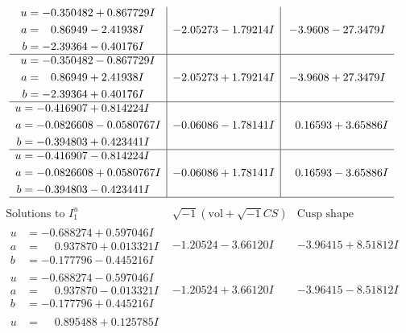 \documentclass[1p]{elsarticle_modified}
\theoremstyle{definition}
\newcommand{\I}{\sqrt{-1}}
\begin{document}
$$\begin{array}{c|c|c}
\begin{aligned}
u &= -0.350482 + 0.867729 I \\
a &= \phantom{-}0.86949 - 2.41938 I \\
b &= -2.39364 - 0.40176 I\end{aligned}
 & -2.05273 - 1.79214 I & -3.9608 - 27.3479 I \\ \hline\begin{aligned}
u &= -0.350482 - 0.867729 I \\
a &= \phantom{-}0.86949 + 2.41938 I \\
b &= -2.39364 + 0.40176 I\end{aligned}
 & -2.05273 + 1.79214 I & -3.9608 + 27.3479 I \\ \hline\begin{aligned}
u &= -0.416907 + 0.814224 I \\
a &= -0.0826608 - 0.0580767 I \\
b &= -0.394803 + 0.423441 I\end{aligned}
 & -0.06086 - 1.78141 I & \phantom{-}0.16593 + 3.65886 I \\ \hline\begin{aligned}
u &= -0.416907 - 0.814224 I \\
a &= -0.0826608 + 0.0580767 I \\
b &= -0.394803 - 0.423441 I\end{aligned}
 & -0.06086 + 1.78141 I & \phantom{-}0.16593 - 3.65886 I\\
 \hline 
 \end{array}$$\newpage$$\begin{array}{c|c|c}  
\text{Solutions to }I^u_{1}& \I (\text{vol} + \sqrt{-1}CS) & \text{Cusp shape}\\
 \hline 
\begin{aligned}
u &= -0.688274 + 0.597046 I \\
a &= \phantom{-}0.937870 + 0.013321 I \\
b &= -0.177796 - 0.445216 I\end{aligned}
 & -1.20524 - 3.66120 I & -3.96415 + 8.51812 I \\ \hline\begin{aligned}
u &= -0.688274 - 0.597046 I \\
a &= \phantom{-}0.937870 - 0.013321 I \\
b &= -0.177796 + 0.445216 I\end{aligned}
 & -1.20524 + 3.66120 I & -3.96415 - 8.51812 I \\ \hline\begin{aligned}
u &= \phantom{-}0.895488 + 0.125785 I \\

\end{aligned}
\end{array}$$
\end{document}

